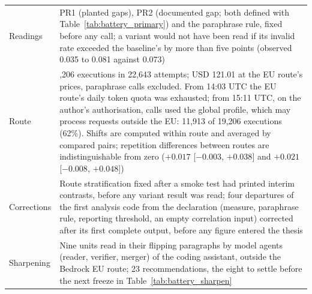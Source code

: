 \begin{longtable}{@{}>{\raggedright\arraybackslash}p{27mm}>{\raggedright\arraybackslash}p{127mm}@{}}
Readings & PR1 (planted gaps), PR2 (documented gap; both defined with Table~\ref{tab:battery_primary}) and the paraphrase rule, fixed before any call; a variant would not have been read if its invalid rate exceeded the baseline's by more than five points (observed 0.035 to 0.081 against 0.073) \\
Route & 19,206 executions in 22,643 attempts; USD 121.01 at the EU route's prices, paraphrase calls excluded. From 14:03 UTC the EU route's daily token quota was exhausted; from 15:11 UTC, on the author's authorisation, calls used the global profile, which may process requests outside the EU: 11,913 of 19,206 executions (62\%). Shifts are computed within route and averaged by compared pairs; repetition differences between routes are indistinguishable from zero ($+0.017$ [$-0.003$, $+0.038$] and $+0.021$ [$-0.008$, $+0.048$]) \\
Corrections & Route stratification fixed after a smoke test had printed interim contrasts, before any variant result was read; four departures of the first analysis code from the declaration (measure, paraphrase rule, reporting threshold, an empty correlation input) corrected after its first complete output, before any figure entered the thesis \\
Sharpening & Nine units read in their flipping paragraphs by model agents (reader, verifier, merger) of the coding assistant, outside the Bedrock EU route; 23 recommendations, the eight to settle before the next freeze in Table~\ref{tab:battery_sharpen} \\
\end{longtable}
\endgroup
